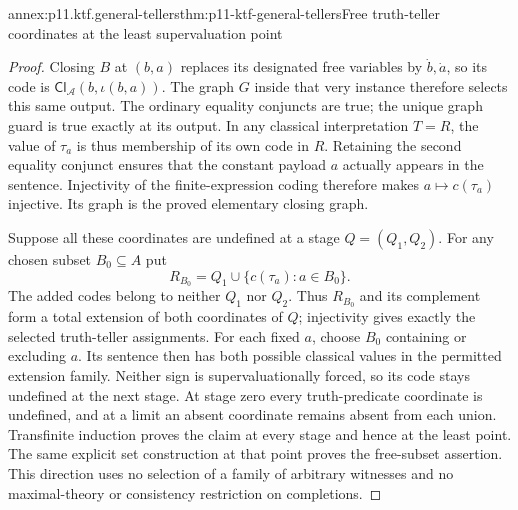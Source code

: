 \begin{annexitem}{annex:p11.ktf.general-tellers}{thm:p11-ktf-general-tellers}{Free truth-teller coordinates at the least supervaluation point}
\begin{proof}
Closing \(B\) at \((b,a)\) replaces its designated free
variables by \(\dot b,\dot a\), so its code is
\(\mathsf{Cl}_{\mathcal A}(b,\iota(b,a))\).
The graph \(G\) inside that very instance therefore selects
this same output. The ordinary equality conjuncts are true; the
unique graph guard is true exactly at its output. In any classical
interpretation \(T=R\), the value of \(\tau_a\) is thus
membership of its own code in \(R\). Retaining the second
equality conjunct ensures that the constant payload \(a\)
actually appears in the sentence. Injectivity of the finite-expression
coding therefore makes \(a\mapsto c(\tau_a)\) injective.
Its graph is the proved elementary closing graph.

Suppose all these coordinates are undefined at a stage
\(Q=(Q_1,Q_2)\). For any chosen subset \(B_0\subseteq A\)
put
\[
 R_{B_0}=Q_1\cup\{c(\tau_a):a\in B_0\}.
\]
The added codes belong to neither \(Q_1\) nor \(Q_2\).
Thus \(R_{B_0}\) and its complement form a total extension
of both coordinates of \(Q\); injectivity gives exactly the
selected truth-teller assignments. For each fixed \(a\), choose
\(B_0\) containing or excluding \(a\). Its sentence then
has both possible classical values in the permitted extension family.
Neither sign is supervaluationally forced, so its code stays undefined
at the next stage. At stage zero every truth-predicate coordinate
is undefined, and at a limit an absent coordinate remains absent
from each union. Transfinite induction proves the claim at every
stage and hence at the least point. The same explicit set construction
at that point proves the free-subset assertion. This direction uses
no selection of a family of arbitrary witnesses and no maximal-theory
or consistency restriction on completions.
\end{proof}
\end{annexitem}


